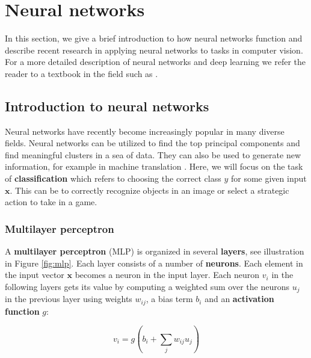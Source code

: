 

\section{Neural networks}
\label{sec:networks}
In this section, we give a brief introduction to how neural networks function and describe recent research in applying neural networks to tasks in computer vision.
For a more detailed description of neural networks and deep learning we refer the reader to a textbook in the field such as \cite{GoodfellowBook}.

\subsection{Introduction to neural networks}

Neural networks have recently become increasingly popular in many diverse fields.
Neural networks can be utilized to find the top principal components and find meaningful clusters in a sea of data. They can also be used to generate new information, for example in machine translation \cite{machine_translation_attention}. Here, we will focus on the task of \textbf{classification} which refers to choosing the correct class $y$ for some given input $\mathbf{x}$. This can be to correctly recognize objects in an image or select a strategic action to take in a game.

\subsubsection{Multilayer perceptron}



A \textbf{multilayer perceptron} (MLP) is organized in several \textbf{layers}, see illustration in Figure \ref{fig:mlp}. Each layer consists of a number of \textbf{neurons}.
Each element in the input vector $\mathbf{x}$ becomes a neuron in the input layer. Each neuron $v_i$ in the following layers gets its value by computing a weighted sum over the neurons $u_j$ in the previous layer using weights  $w_{ij}$, a bias term $b_i$ and an \textbf{activation function} $g$:

\[
v_i = g\left( b_i + \sum_j w_{ij} u_j \right)
\]


